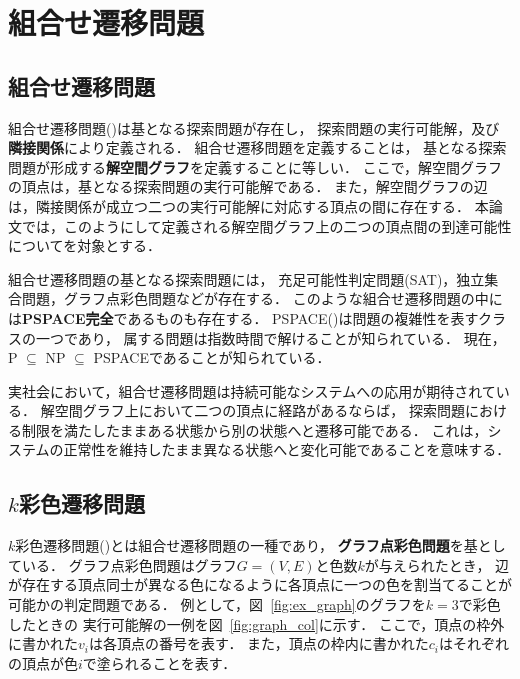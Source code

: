 \chapter{組合せ遷移問題} \label{chap:background}

\section{組合せ遷移問題}
組合せ遷移問題(\cite{Ito18:tohoku})は基となる探索問題が存在し，
探索問題の実行可能解，及び\textbf{隣接関係}により定義される．
組合せ遷移問題を定義することは，
基となる探索問題が形成する\textbf{解空間グラフ}を定義することに等しい．
ここで，解空間グラフの頂点は，基となる探索問題の実行可能解である． 
また，解空間グラフの辺は，隣接関係が成立つ二つの実行可能解に対応する頂点の間に存在する．
本論文では，このようにして定義される解空間グラフ上の二つの頂点間の到達可能性についてを対象とする．

組合せ遷移問題の基となる探索問題には，
充足可能性判定問題(SAT)，独立集合問題，グラフ点彩色問題などが存在する．
このような組合せ遷移問題の中には\textbf{PSPACE完全}であるものも存在する． 
PSPACE(\cite{Kuriyama13:ieice})は問題の複雑性を表すクラスの一つであり，
属する問題は指数時間で解けることが知られている． 
現在，P $\subseteq$ NP $\subseteq$ PSPACEであることが知られている．

実社会において，組合せ遷移問題は持続可能なシステムへの応用が期待されている． 
解空間グラフ上において二つの頂点に経路があるならば，
探索問題における制限を満たしたままある状態から別の状態へと遷移可能である． 
これは，システムの正常性を維持したまま異なる状態へと変化可能であることを意味する．

\section{$k$彩色遷移問題}
$k$彩色遷移問題(\cite{BC2009:tcs})とは組合せ遷移問題の一種であり，
\textbf{グラフ点彩色問題}を基としている． 
グラフ点彩色問題はグラフ$G=(V, E)$と色数$k$が与えられたとき，
辺が存在する頂点同士が異なる色になるように各頂点に一つの色を割当てることが可能かの判定問題である． 
例として，図~\ref{fig:ex_graph}のグラフを$k=3$で彩色したときの
実行可能解の一例を図~\ref{fig:graph_col}に示す． 
ここで，頂点の枠外に書かれた$v_i$は各頂点の番号を表す．
また，頂点の枠内に書かれた$c_i$はそれぞれの頂点が色$i$で塗られることを表す．

